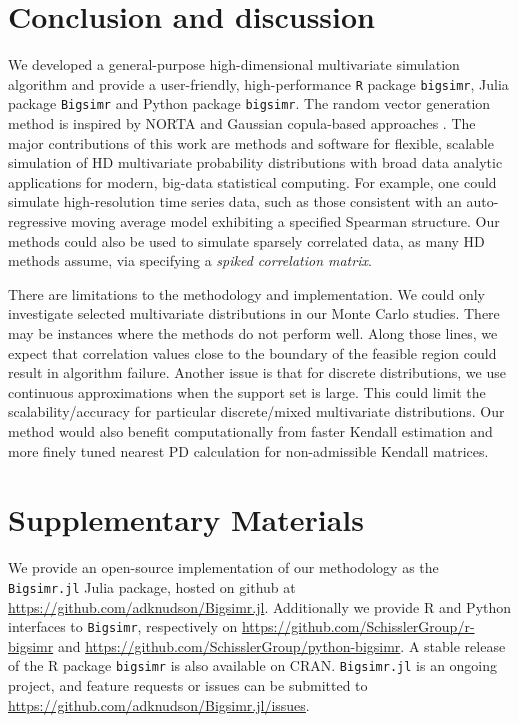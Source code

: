 \documentclass[
]{jss}
\begin{document}
\hypertarget{discussion}{%
\section{Conclusion and discussion}\label{discussion}}

We developed a general-purpose high-dimensional multivariate simulation algorithm and provide a user-friendly, high-performance \texttt{R} package \texttt{bigsimr}, Julia package \texttt{Bigsimr} and Python package \texttt{bigsimr}. The random vector generation method is inspired by NORTA \citep{Cario1997} and Gaussian copula-based approaches \citep[\citet{BF17}, \citet{Xia17}]{MB13}. The major contributions of this work are methods and software for flexible, scalable simulation of HD multivariate probability distributions with broad data analytic applications for modern, big-data statistical computing. For example, one could simulate high-resolution time series data, such as those consistent with an auto-regressive moving average model exhibiting a specified Spearman structure. Our methods could also be used to simulate sparsely correlated data, as many HD methods assume, via specifying a \emph{spiked correlation matrix}.

There are limitations to the methodology and implementation. We could only investigate selected multivariate distributions in our Monte Carlo studies. There may be instances where the methods do not perform well. Along those lines, we expect that correlation values close to the boundary of the feasible region could result in algorithm failure. Another issue is that for discrete distributions, we use continuous approximations when the support set is large. This could limit the scalability/accuracy for particular discrete/mixed multivariate distributions. Our method would also benefit computationally from faster Kendall estimation and more finely tuned nearest PD calculation for non-admissible Kendall matrices.

\hypertarget{misc}{%
\section*{Supplementary Materials}\label{misc}}

We provide an open-source implementation of our methodology as the \texttt{Bigsimr.jl} Julia package, hosted on github at \url{https://github.com/adknudson/Bigsimr.jl}. Additionally we provide R and Python interfaces to \texttt{Bigsimr}, respectively on \url{https://github.com/SchisslerGroup/r-bigsimr} and \url{https://github.com/SchisslerGroup/python-bigsimr}. A stable release of the R package \texttt{bigsimr} is also available on CRAN. \texttt{Bigsimr.jl} is an ongoing project, and feature requests or issues can be submitted to \url{https://github.com/adknudson/Bigsimr.jl/issues}.
\end{document}
